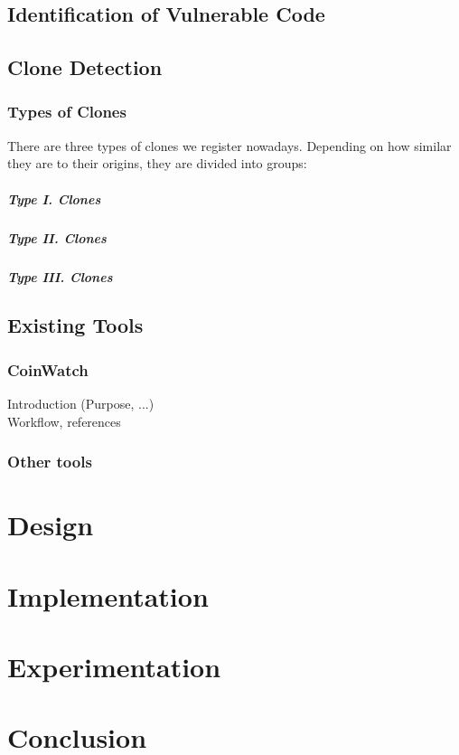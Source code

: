   \section{Identification of Vulnerable Code}

  \section{Clone Detection}
    \subsection*{Types of Clones}
      There are three types of clones we register nowadays. Depending on  how similar they are to their
      origins, they are divided into groups:
      \paragraph{Type I. Clones}
      \paragraph{Type II. Clones}
      \paragraph{Type III. Clones}

  \section{Existing Tools}

    \subsection*{CoinWatch}
      Introduction (Purpose, ...) \\
      Workflow, references

    \subsection*{Other tools}


\chapter{Design}


\chapter{Implementation}


\chapter{Experimentation}


\chapter{Conclusion}
